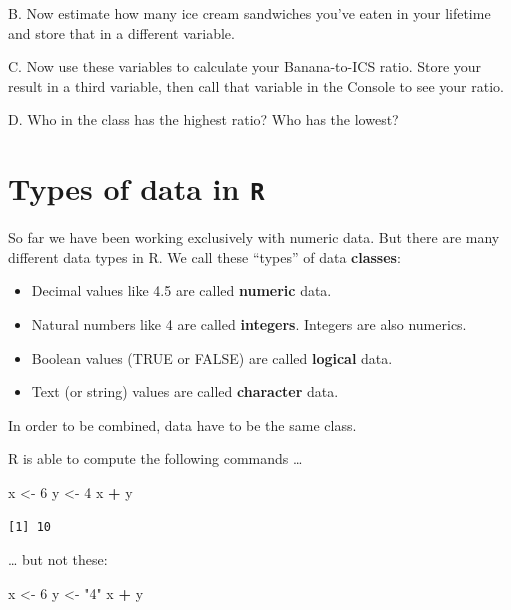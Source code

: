 \documentclass[
]{book}
\newenvironment{Shaded}{\begin{snugshade}}{\end{snugshade}}
\newcommand{\DecValTok}[1]{\textcolor[rgb]{0.00,0.00,0.81}{#1}}
\newcommand{\NormalTok}[1]{#1}
\newcommand{\OperatorTok}[1]{\textcolor[rgb]{0.81,0.36,0.00}{\textbf{#1}}}
\newcommand{\StringTok}[1]{\textcolor[rgb]{0.31,0.60,0.02}{#1}}
\providecommand{\tightlist}{%
  \setlength{\itemsep}{0pt}\setlength{\parskip}{0pt}}
\begin{document}
B. Now estimate how many ice cream sandwiches you've eaten in your lifetime and store that in a different variable.

C. Now use these variables to calculate your Banana-to-ICS ratio. Store your result in a third variable, then call that variable in the Console to see your ratio.

D. Who in the class has the highest ratio? Who has the lowest?

\hypertarget{types-of-data-in-r}{%
\section*{\texorpdfstring{Types of data in \texttt{R}}{Types of data in R}}\label{types-of-data-in-r}}

So far we have been working exclusively with numeric data. But there are many different data types in R. We call these ``types'' of data \textbf{classes}:

\begin{itemize}
\tightlist
\item
  Decimal values like 4.5 are called \textbf{numeric} data.
\item
  Natural numbers like 4 are called \textbf{integers}. Integers are also numerics.
\item
  Boolean values (TRUE or FALSE) are called \textbf{logical} data.
\item
  Text (or string) values are called \textbf{character} data.
\end{itemize}

In order to be combined, data have to be the same class.

R is able to compute the following commands \ldots{}

\begin{Shaded}
\begin{Highlighting}[]
\NormalTok{x <-}\StringTok{ }\DecValTok{6}
\NormalTok{y <-}\StringTok{ }\DecValTok{4}
\NormalTok{x }\OperatorTok{+}\StringTok{ }\NormalTok{y}
\end{Highlighting}
\end{Shaded}

\begin{verbatim}
[1] 10
\end{verbatim}

\ldots{} but not these:

\begin{Shaded}
\begin{Highlighting}[]
\NormalTok{x <-}\StringTok{ }\DecValTok{6}
\NormalTok{y <-}\StringTok{ "4"}
\NormalTok{x }\OperatorTok{+}\StringTok{ }\NormalTok{y}
\end{Highlighting}
\end{Shaded}
\end{document}
